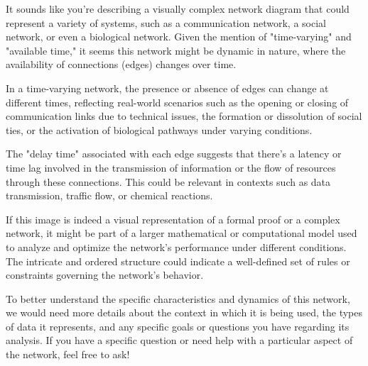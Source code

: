 It sounds like you're describing a visually complex network diagram that could represent a variety of systems, such as a communication network, a social network, or even a biological network. Given the mention of "time-varying" and "available time," it seems this network might be dynamic in nature, where the availability of connections (edges) changes over time.

In a time-varying network, the presence or absence of edges can change at different times, reflecting real-world scenarios such as the opening or closing of communication links due to technical issues, the formation or dissolution of social ties, or the activation of biological pathways under varying conditions.

The "delay time" associated with each edge suggests that there's a latency or time lag involved in the transmission of information or the flow of resources through these connections. This could be relevant in contexts such as data transmission, traffic flow, or chemical reactions.

If this image is indeed a visual representation of a formal proof or a complex network, it might be part of a larger mathematical or computational model used to analyze and optimize the network's performance under different conditions. The intricate and ordered structure could indicate a well-defined set of rules or constraints governing the network's behavior.

To better understand the specific characteristics and dynamics of this network, we would need more details about the context in which it is being used, the types of data it represents, and any specific goals or questions you have regarding its analysis. If you have a specific question or need help with a particular aspect of the network, feel free to ask!